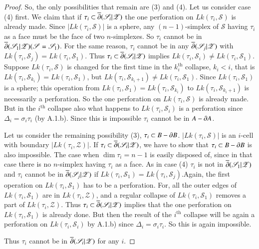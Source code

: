 \begin{proof}
So, the only possibilities that remain are (3) and (4). Let us consider case (4) first. We claim that if $\tau_{i}\subset \overline{\partial}(\mathscr{S}_{i}|\mathscr{Z})$ the one perforation on $Lk(\tau_{i},\mathscr{S})$ is already made. Since $|Lk(\tau_{i},\mathscr{S})|$ is a sphere, any $(n-1)$-simplex of $\mathscr{S}$ having $\tau_{i}$ as a face must be the face of two $n$-simplexes. So $\tau_{i}$ cannot be in $\overline{\partial}(\mathscr{S}_{1}|\mathscr{Z})(\mathscr{S}=\mathscr{S}_{1})$. For the same reason, $\tau_{i}$ cannot be in any $\overline{\partial}(\mathscr{S}_{j}|\mathscr{Z})$ with $Lk(\tau_{i},\mathscr{S}_{j})=Lk(\tau_{i},\mathscr{S}_{1})$. Thus $\tau_{i}\subset \overline{\partial}(\mathscr{S}_{i}|\mathscr{Z})$ implies $Lk(\tau_{i},\mathscr{S}_{i})\neq Lk(\tau_{i},\mathscr{S}_{1})$. Suppose $Lk(\tau_{i},\mathscr{S})$ is changed for the first time in the $k^{\text{th}}_{i}$ collapse, 
$k_{i}<i$, that is $Lk(\tau_{i},\mathscr{S}_{k_{i}})=Lk(\tau_{i},\mathscr{S}_{1})$, but $Lk(\tau_{i},\mathscr{S}_{k_{i}+1})\neq Lk(\tau_{i},\mathscr{S}_{1})$. Since $Lk(\tau_{i},\mathscr{S}_{1})$ is a sphere; this operation from $Lk(\tau_{i},\mathscr{S}_{1})=Lk(\tau_{i},\mathscr{S}_{k_{i}})$ to $Lk(\tau_{i},\mathscr{S}_{k_{i}+1})$ is necessarily a perforation. So the one perforation on $Lk(\tau_{i},\mathscr{S})$ is already made. But in the $i^{\text{th}}$ collapse also what happens to $Lk(\tau_{i},\mathscr{S}_{i})$ is a perforation since $\Delta_{i}=\sigma_{i}\tau_{i}$ (by A.1.b). Since this is impossible $\tau_{i}$ cannot be in $A-\partial A$.

Let us consider the remaining possibility (3), $\tau_{i}\subset B-\partial B$. $|Lk(\tau_{i},\mathscr{S})|$ is an $i$-cell with boundary $|Lk(\tau_{i},\mathscr{Z})|$. If $\tau_{i}\subset \overline{\partial}(\mathscr{S}_{i}|\mathscr{Z})$, we have to show that $\tau_{i}\subset B-\partial B$ is also impossible. The case when $\dim \tau_{i}=n-1$ is easily disposed of, since in that case there is no $n$-simplex having $\tau_{i}$ as a face. As in case (4) $\tau_{i}$ is not in $\overline{\partial}(\mathscr{S}_{1}|\mathscr{Z})$ and $\tau_{i}$ cannot be in $\overline{\partial}(\mathscr{S}_{j}|\mathscr{Z})$ if $Lk(\tau_{i},\mathscr{S}_{1})=Lk(\tau_{i},\mathscr{S}_{j})$.\pageoriginale Again, the first operation on $Lk(\tau_{i},\mathscr{S}_{1})$ has to be a perforation. For, all the outer edges of $Lk(\tau_{i},\mathscr{S}_{1})$ are in $Lk(\tau_{i},\mathscr{Z})$, and a regular collapse of $Lk(\tau_{i},\mathscr{S}_{1})$ removes a part of $Lk(\tau_{i},\mathscr{Z})$. Thus $\tau_{i}\subset\overline{\partial}(\mathscr{S}_{i}|\mathscr{Z})$ implies that the one perforation on $Lk(\tau_{i},\mathscr{S}_{1})$ is already done. But then the result of the $i^{\text{th}}$ collapse will be again a perforation on $Lk(\tau_{i},\mathscr{S}_{i})$ by A.1.b) since $\Delta_{i}=\sigma_{i}\tau_{i}$. So this is again impossible.

Thus $\tau_{i}$ cannot be in $\overline{\partial}(\mathscr{S}_{i}|\mathscr{Z})$ for any $i$.
\end{proof}
 

